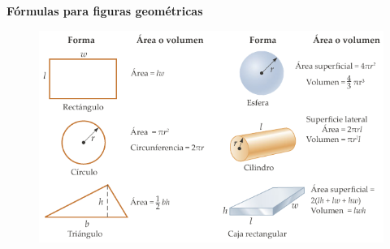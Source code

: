 \begin{frame}{}
    \textbf{Fórmulas para figuras geométricas \cite{Serway-2018}}
    \begin{figure}
        \centering
        \includegraphics[width=0.90\linewidth]{figures/figuras_geo.pdf}
        \label{fig:append01}
    \end{figure}
\end{frame}
